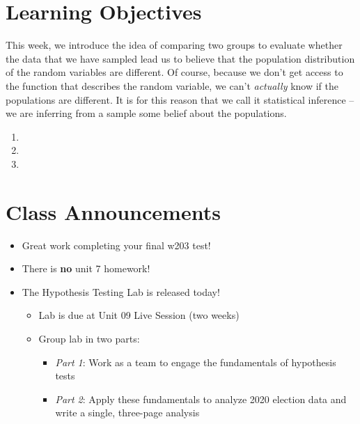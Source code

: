\documentclass[
]{book}
\providecommand{\tightlist}{%
  \setlength{\itemsep}{0pt}\setlength{\parskip}{0pt}}
\theoremstyle{definition}
\theoremstyle{definition}
\theoremstyle{definition}
\theoremstyle{definition}
\theoremstyle{remark}
\begin{document}
\hypertarget{learning-objectives-6}{%
\section{Learning Objectives}\label{learning-objectives-6}}

This week, we introduce the idea of comparing two groups to evaluate whether the data that we have sampled lead us to believe that the population distribution of the random variables are different. Of course, because we don't get access to the function that describes the random variable, we can't \emph{actually} know if the populations are different. It is for this reason that we call it statistical inference -- we are inferring from a sample some belief about the populations.

\begin{enumerate}
\def\labelenumi{\arabic{enumi}.}
\tightlist
\item
\item
\item
\end{enumerate}

\hypertarget{class-announcements-5}{%
\section{Class Announcements}\label{class-announcements-5}}

\begin{itemize}
\tightlist
\item
  Great work completing your final w203 test!
\item
  There is \textbf{no} unit 7 homework!
\item
  The Hypothesis Testing Lab is released today!

  \begin{itemize}
  \tightlist
  \item
    Lab is due at Unit 09 Live Session (two weeks)
  \item
    Group lab in two parts:

    \begin{itemize}
    \tightlist
    \item
      \emph{Part 1}: Work as a team to engage the fundamentals of hypothesis tests
    \item
      \emph{Part 2}: Apply these fundamentals to analyze 2020 election data and write a single, three-page analysis
    \end{itemize}
  \end{itemize}
\end{itemize}
\end{document}
